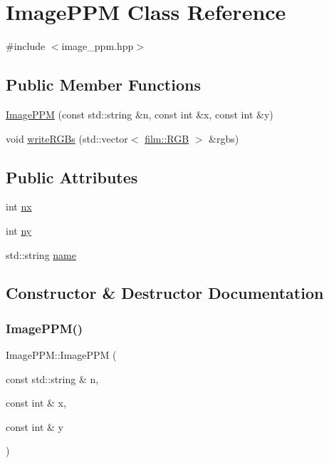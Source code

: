 \hypertarget{classImagePPM}{}\section{Image\+P\+PM Class Reference}
\label{classImagePPM}


{\ttfamily \#include $<$image\+\_\+ppm.\+hpp$>$}

\subsection*{Public Member Functions}
\begin{DoxyCompactItemize}
\item 
\mbox{\hyperlink{classImagePPM_a687348867b24ae6177e3a6a79352453f}{Image\+P\+PM}} (const std\+::string \&n, const int \&x, const int \&y)
\item 
void \mbox{\hyperlink{classImagePPM_a63b4143e85d5c2bd5a2dcfaabb53c4ce}{write\+R\+G\+Bs}} (std\+::vector$<$ \mbox{\hyperlink{structfilm_1_1RGB}{film\+::\+R\+GB}} $>$ \&rgbs)
\end{DoxyCompactItemize}
\subsection*{Public Attributes}
\begin{DoxyCompactItemize}
\item 
int \mbox{\hyperlink{classImagePPM_a7d656e1c3551fa1ce5635ff3f205f805}{nx}}
\item 
int \mbox{\hyperlink{classImagePPM_a485d31f3eff0b4bd64d2a5e31e5b8503}{ny}}
\item 
std\+::string \mbox{\hyperlink{classImagePPM_a5d51ed55062c7c4e462f96407dac2bec}{name}}
\end{DoxyCompactItemize}


\subsection{Constructor \& Destructor Documentation}
\mbox{\label{classImagePPM_a687348867b24ae6177e3a6a79352453f}} 
\subsubsection{\texorpdfstring{ImagePPM()}{ImagePPM()}}
{\footnotesize\ttfamily Image\+P\+P\+M\+::\+Image\+P\+PM (\begin{DoxyParamCaption}\item[{const std\+::string \&}]{n,  }\item[{const int \&}]{x,  }\item[{const int \&}]{y }\end{DoxyParamCaption})}




